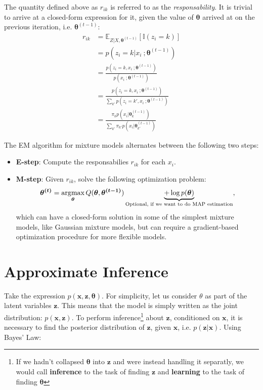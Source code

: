 The quantity defined above as $r_{ik}$ is referred to as the \emph{responsability}. It
is trivial to arrive at a closed-form expression for it, given the value of $\bm{\theta}$
arrived at on the previous iteration, i.e. $\bm{\theta}^{(t-1)}$:
\begin{align}
r_{ik} &= \mathbb{E}_{Z|X, \bm{\theta}^{(t-1)}}[\mathbb{I}(z_i = k)] \\
    &= p(z_i = k | x_i\ ; \bm{\theta}^{(t-1)}) \\
    &= \frac{p(z_i = k , x_i\ ; \bm{\theta}^{(t-1)})}{p(x_i\ ; \bm{\theta}^{(t-1)})} \\
    &= \frac{p(z_i = k , x_i\ ; \bm{\theta}^{(t-1)})}{\sum_{k'} p(z_i = k' , x_i\ ; \bm{\theta}^{(t-1)})} \\
    &= \frac{\pi_k p(x_i | \bm{\theta}_k^{(t-1)})}{\sum_{k'} \pi_{k'} p(x_i | \bm{\theta}_{k'}^{(t-1)})}
\end{align}

The EM algorithm for mixture models alternates between the following two steps:
\begin{itemize}
    \item \textbf{E-step}: Compute the responsabilies $r_{ik}$ for each $x_i$.
    \item \textbf{M-step}: Given $r_{ik}$, solve the following optimization
        problem:
        \begin{align}
            \bm{\theta^{(t)}} = \argmax_{\bm{\theta}} Q(\bm{\theta}, \bm{\theta^{(t-1)}})
                \underbrace{+ \log p(\bm{\theta})}_\text{Optional, if we want to do MAP estimation},
        \end{align} which can have a closed-form solution in some of the simplest
        mixture models, like Gaussian mixture models, but can require a gradient-based
        optimization procedure for more flexible models.
\end{itemize}

\section{Approximate Inference}
\label{section:probmodelinf}
Take the expression $p(\bm{x}, \bm{z}, \bm{\theta})$. For simplicity, let us consider $\theta$
as part of the latent variables $\bm{z}$. This means that the model is simply written
as the joint distribution: $p(\bm{x}, \bm{z})$. To perform inference\footnote{If we
hadn't collapsed $\bm{\theta}$ into $\bm{z}$ and were instead handling it separatly,
we would call \textbf{inference} to the task of finding $\bm{z}$ and \textbf{learning}
to the task of finding $\bm{\theta}$} about $\bm{z}$, conditioned on $\bm{x}$, it
is necessary to find the posterior distribution of $\bm{z}$, given $\bm{x}$, i.e.
$p(\bm{z}|\bm{x})$. Using Bayes' Law:

